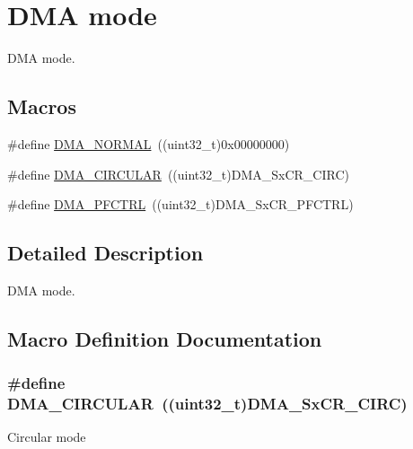 \hypertarget{group___d_m_a__mode}{}\section{D\+MA mode}
\label{group___d_m_a__mode}


D\+MA mode.  


\subsection*{Macros}
\begin{DoxyCompactItemize}
\item 
\#define \hyperlink{group___d_m_a__mode_ga04941acfbbdefc53e1e08133cffa3b8a}{D\+M\+A\+\_\+\+N\+O\+R\+M\+AL}~((uint32\+\_\+t)0x00000000)
\item 
\#define \hyperlink{group___d_m_a__mode_ga4c4f425cba13edffb3c831c036c91e01}{D\+M\+A\+\_\+\+C\+I\+R\+C\+U\+L\+AR}~((uint32\+\_\+t)D\+M\+A\+\_\+\+Sx\+C\+R\+\_\+\+C\+I\+RC)
\item 
\#define \hyperlink{group___d_m_a__mode_ga7974ee645c8e275a2297cf37eec9e022}{D\+M\+A\+\_\+\+P\+F\+C\+T\+RL}~((uint32\+\_\+t)D\+M\+A\+\_\+\+Sx\+C\+R\+\_\+\+P\+F\+C\+T\+RL)
\end{DoxyCompactItemize}


\subsection{Detailed Description}
D\+MA mode. 



\subsection{Macro Definition Documentation}
\subsubsection[{\texorpdfstring{D\+M\+A\+\_\+\+C\+I\+R\+C\+U\+L\+AR}{DMA_CIRCULAR}}]{\setlength{\rightskip}{0pt plus 5cm}\#define D\+M\+A\+\_\+\+C\+I\+R\+C\+U\+L\+AR~((uint32\+\_\+t)D\+M\+A\+\_\+\+Sx\+C\+R\+\_\+\+C\+I\+RC)}\hypertarget{group___d_m_a__mode_ga4c4f425cba13edffb3c831c036c91e01}{}\label{group___d_m_a__mode_ga4c4f425cba13edffb3c831c036c91e01}
Circular mode 
